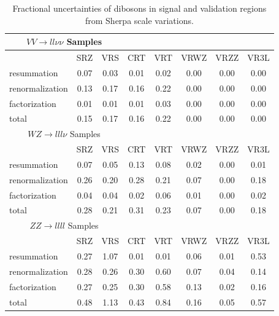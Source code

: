 \begin{table}
	\begin{center}
 		\begin{tabular}{l|c|c|c|c|c|c|c}
		    \hline \hline 
   			\multicolumn{3}{c}{$VV \rightarrow ll\nu\nu$ Samples} \\
  	 		\hline
			&	SRZ & VRS & CRT & VRT & VRWZ & VRZZ & VR3L \\
			\hline
			resummation & 0.07 & 0.03 & 0.01 & 0.02 & 0.00 & 0.00 & 0.00 \\
			renormalization & 0.13 & 0.17 & 0.16 & 0.22 & 0.00 & 0.00 & 0.00 \\
			factorization & 0.01 & 0.01 & 0.01 & 0.03 & 0.00 & 0.00 & 0.00 \\
			total & 0.15 & 0.17 & 0.16 & 0.22 & 0.00 & 0.00 & 0.00 \\
		    \hline 
   			\multicolumn{3}{c}{$WZ \rightarrow lll\nu$ Samples} \\
  	 		\hline
			&	SRZ & VRS & CRT & VRT & VRWZ & VRZZ & VR3L \\
			\hline
			resummation & 0.07 & 0.05 & 0.13 & 0.08 & 0.02 & 0.00 & 0.01 \\
			renormalization & 0.26 & 0.20 & 0.28 & 0.21 & 0.07 & 0.00 & 0.18 \\
			factorization & 0.04 & 0.04 & 0.02 & 0.06 & 0.01 & 0.00 & 0.02 \\
			total & 0.28 & 0.21 & 0.31 & 0.23 & 0.07 & 0.00 & 0.18 \\
  	 		\hline
   			\multicolumn{3}{c}{$ZZ \rightarrow llll$ Samples} \\
  	 		\hline
			&	SRZ & VRS & CRT & VRT & VRWZ & VRZZ & VR3L \\
			\hline
			resummation & 0.27 & 1.07 & 0.01 & 0.01 & 0.06 & 0.01 & 0.53 \\
			renormalization & 0.28 & 0.26 & 0.30 & 0.60 & 0.07 & 0.04 & 0.14 \\
			factorization & 0.27 & 0.25 & 0.30 & 0.58 & 0.13 & 0.02 & 0.16 \\
			total & 0.48 & 1.13 & 0.43 & 0.84 & 0.16 & 0.05 & 0.57 \\
  	 		\hline
 		\end{tabular}
	\end{center}
	\caption{Fractional uncertainties of dibosons in signal and validation regions from Sherpa scale variations.}
	\label{table:Diboson_theoryuncert}
\end{table}

